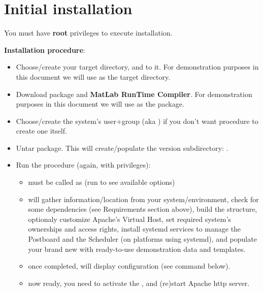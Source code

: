 \section{Initial installation}

You must have \textbf{root} privileges to execute \webobs installation. 

\textbf{Installation procedure}:

\begin{itemize}
\item   Choose/create your target \webobs directory, and  to it. For
demonstration purposes in this document we will use  as the target \webobs directory. 
\item   Download \webobs package and \textbf{MatLab RunTime Compiler}. For
demonstration purposes in this document we will use  as the \webobs package. 
\item   Choose/create the system's \webobs user+group (aka ) if you don't want  procedure
to create one itself.


\item   Untar \webobs package. This will create/populate the \webobs version subdirectory: 
.
\item   Run the  procedure (again, with  privileges):
\begin{itemize}
\item   must be called as  (run  to see available options)
\item   {} will gather information/location from your system/environment,
check for some dependencies (see Requirements section above), build the \webobs
structure, optionaly customize Apache's \webobs Virtual Host, set required system's
ownerships and access rights, install systemd services to manage the Postboard
and the Scheduler (on platforms using systemd), and populate your brand new
\webobs with ready-to-use demonstration data and templates.
\item   once completed,  will display \webobs configuration (see  command below).
\item   \webobs now ready, you need to activate the ,  and (re)start Apache http server. 
\end{itemize}
\end{itemize}


